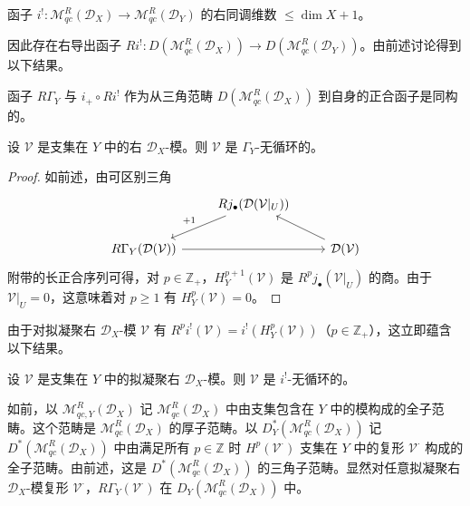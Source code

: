 \begin{lemma}\label{lem:4.9.2}
函子 $i^!:\mathcal{M}^R_{qc}(\mathcal{D}_X)\to\mathcal{M}^R_{qc}(\mathcal{D}_Y)$ 的右同调维数 $\le\dim X+1$。
\end{lemma}

因此存在右导出函子
$Ri^!:D(\mathcal{M}^R_{qc}(\mathcal{D}_X))\to D(\mathcal{M}^R_{qc}(\mathcal{D}_Y))$。由前述讨论得到以下结果。

\begin{theorem}\label{thm:4.9.3}
函子 $R\Gamma_Y$ 与 $i_+\circ Ri^!$ 作为从三角范畴 $D(\mathcal{M}^R_{qc}(\mathcal{D}_X))$ 到自身的正合函子是同构的。
\end{theorem}

\begin{lemma}\label{lem:4.9.4}
设 $\mathcal{V}$ 是支集在 $Y$ 中的右 $\mathcal{D}_X$-模。则 $\mathcal{V}$ 是 $\Gamma_Y$-无循环的。
\end{lemma}

\begin{proof}
如前述，由可区别三角
$$\begin{tikzcd}
& Rj_\bullet(\mathcal{D}(\mathcal{V}|_U)) \arrow[dl,"+1"'] & \\
R\Gamma_Y(\mathcal{D}(\mathcal{V})) \arrow[rr] && \mathcal{D}(\mathcal{V}) \arrow[lu]
\end{tikzcd}$$
附带的长正合序列可得，对 $p\in\mathbb{Z}_+$，$H^{p+1}_Y(\mathcal{V})$ 是
$R^pj_\bullet(\mathcal{V}|_U)$ 的商。由于 $\mathcal{V}|_U=0$，这意味着对 $p\ge1$ 有 $H^p_Y(\mathcal{V})=0$。
\end{proof}

由于对拟凝聚右 $\mathcal{D}_X$-模 $\mathcal{V}$ 有 $R^pi^!(\mathcal{V})=i^!(H_Y^p(\mathcal{V}))$（$p\in\mathbb{Z}_+$），这立即蕴含以下结果。

\begin{corollary}\label{cor:4.9.5}
设 $\mathcal{V}$ 是支集在 $Y$ 中的拟凝聚右 $\mathcal{D}_X$-模。则 $\mathcal{V}$ 是 $i^!$-无循环的。
\end{corollary}

如前，以 $\mathcal{M}^R_{qc,Y}(\mathcal{D}_X)$ 记 $\mathcal{M}^R_{qc}(\mathcal{D}_X)$ 中由支集包含在 $Y$ 中的模构成的全子范畴。这个范畴是 $\mathcal{M}^R_{qc}(\mathcal{D}_X)$ 的厚子范畴。以
$D_Y^*(\mathcal{M}^R_{qc}(\mathcal{D}_X))$ 记 $D^*(\mathcal{M}^R_{qc}(\mathcal{D}_X))$ 中由满足所有 $p\in\mathbb{Z}$ 时 $H^p(\mathcal{V}^\cdot)$ 支集在 $Y$ 中的复形 $\mathcal{V}^\cdot$ 构成的全子范畴。由前述，这是 $D^*(\mathcal{M}^R_{qc}(\mathcal{D}_X))$ 的三角子范畴。显然对任意拟凝聚右 $\mathcal{D}_X$-模复形 $\mathcal{V}^\cdot$，$R\Gamma_Y(\mathcal{V}^\cdot)$ 在
$D_Y(\mathcal{M}^R_{qc}(\mathcal{D}_X))$ 中。

